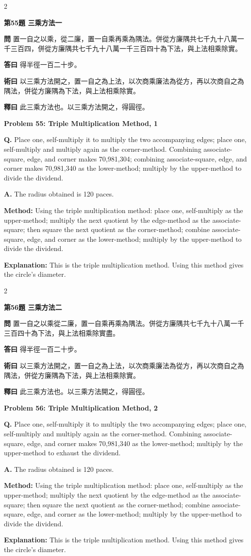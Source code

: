 \documentclass[11pt,a4paper]{article}
\newcommand{\wen}[1]{\noindent\textbf{問} #1\par\smallskip}
\newcommand{\da}[1]{\noindent\textbf{答曰} #1\par\smallskip}
\newcommand{\shu}[1]{\noindent\textbf{術曰} #1\par\smallskip}
\newcommand{\shi}[1]{\noindent\textbf{釋曰} #1\par\smallskip}
\newcommand{\wenE}[1]{\noindent\textbf{Q.} #1\par\smallskip}
\newcommand{\daE}[1]{\noindent\textbf{A.} #1\par\smallskip}
\newcommand{\shuE}[1]{\noindent\textbf{Method:} #1\par\smallskip}
\newcommand{\shiE}[1]{\noindent\textbf{Explanation:} #1\par\smallskip}
\begin{document}
\bigskip

\begin{paracol}{2}

\noindent\textbf{第55題 三乘方法一}

\wen{置一自之以乘，從二廉，置一自乘再乘為隅法。併從方廉隅共七千九十八萬一千三百四，併從方廉隅共七千九十八萬一千三百四十為下法，與上法相乘除實。}
\da{得半徑一百二十步。}
\shu{以三乘方法開之，置一自之為上法，以次商乘廉法為從方，再以次商自之為隅法，併從方廉隅為下法，與上法相乘除實。}
\shi{此三乘方法也。以三乘方法開之，得圓徑。}

\switchcolumn

\noindent\textbf{Problem 55: Triple Multiplication Method, 1}

\wenE{Place one, self-multiply it to multiply the two accompanying edges; place one, self-multiply and multiply again as the corner-method. Combining associate-square, edge, and corner makes 70,981,304; combining associate-square, edge, and corner makes 70,981,340 as the lower-method; multiply by the upper-method to divide the dividend.}
\daE{The radius obtained is 120 paces.}
\shuE{Using the triple multiplication method: place one, self-multiply as the upper-method; multiply the next quotient by the edge-method as the associate-square; then square the next quotient as the corner-method; combine associate-square, edge, and corner as the lower-method; multiply by the upper-method to divide the dividend.}
\shiE{This is the triple multiplication method. Using this method gives the circle's diameter.}

\end{paracol}

\bigskip

\begin{paracol}{2}

\noindent\textbf{第56題 三乘方法二}

\wen{置一自之以乘從二廉，置一自乘再乘為隅法。併從方廉隅共七千九十八萬一千三百四十為下法，與上法相乘除實盡。}
\da{得半徑一百二十步。}
\shu{以三乘方法開之，置一自之為上法，以次商乘廉法為從方，再以次商自之為隅法，併從方廉隅為下法，與上法相乘除實。}
\shi{此三乘方法也。以三乘方法開之，得圓徑。}

\switchcolumn

\noindent\textbf{Problem 56: Triple Multiplication Method, 2}

\wenE{Place one, self-multiply it to multiply the two accompanying edges; place one, self-multiply and multiply again as the corner-method. Combining associate-square, edge, and corner makes 70,981,340 as the lower-method; multiply by the upper-method to exhaust the dividend.}
\daE{The radius obtained is 120 paces.}
\shuE{Using the triple multiplication method: place one, self-multiply as the upper-method; multiply the next quotient by the edge-method as the associate-square; then square the next quotient as the corner-method; combine associate-square, edge, and corner as the lower-method; multiply by the upper-method to divide the dividend.}
\shiE{This is the triple multiplication method. Using this method gives the circle's diameter.}

\end{paracol}
\end{document}
